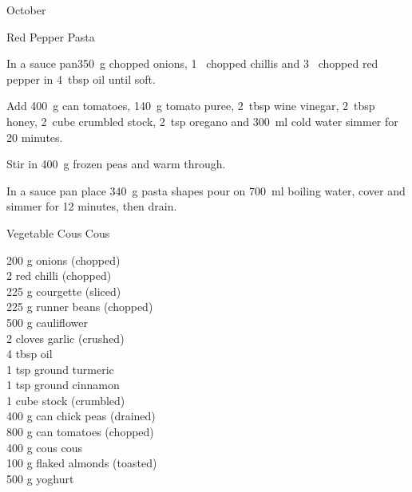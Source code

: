 \begin{menu}{October}
\begin{recipe}{2}{Red Pepper Pasta}
    \begin{instructions}
    \item 
        In a sauce pan350~g chopped onions,
        1~ chopped chillis
        and
        3~ chopped red pepper
        in
        4~tbsp  oil
        until soft.
      \item 
        Add
        400~g  can tomatoes,
        140~g  tomato puree,
        2~tbsp  wine vinegar,
        2~tbsp  honey,
        2~cube crumbled stock,
        2~tsp  oregano
        and
        300~ml  cold water
        simmer for 20 minutes.
      \item 
        Stir in
        400~g  frozen peas
        and warm through.
      \item 
    In a
    sauce pan
    place
    340~g  pasta shapes
    pour on
    700~ml  boiling water,
    cover and simmer for 12 minutes, then drain.
  
    \end{instructions}
    \end{recipe}%
  
    \begin{recipe}{2}{Vegetable Cous Cous}%
		\begin{ingredients}
		200 g onions (chopped) \\
	2  red chilli (chopped) \\
	225 g courgette (sliced) \\
	225 g runner beans (chopped) \\
	500 g cauliflower  \\
	2 cloves garlic (crushed) \\
	4 tbsp oil  \\
	1 tsp ground turmeric  \\
	1 tsp ground cinnamon  \\
	1 cube stock (crumbled) \\
	400 g can chick peas (drained) \\
	800 g can tomatoes (chopped) \\
	400 g cous cous  \\
	100 g flaked almonds (toasted) \\
	500 g yoghurt  \\
	
		\end{ingredients}
	
	

\end{recipe}
\end{menu}
